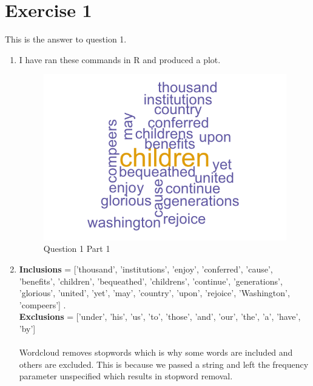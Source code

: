 \documentclass{article}
\date{}
\begin{document}
	
\section{Exercise 1}
This is the answer to question 1.
\begin{enumerate}
	
	\item I have ran these commands in R and produced a plot.
	\begin{figure}[!h]
		\centering
		\includegraphics[width=0.3\linewidth]{q1e1.png}
		\caption{Question 1 Part 1}
	\end{figure}
	
	\item \textbf{Inclusions} = ['thousand',  'institutions', 'enjoy', 'conferred', 'cause', 'benefits', 'children', 'bequeathed', 'childrens', 'continue', 'generations', 'glorious', 'united', 'yet', 'may', 'country', 'upon', 'rejoice', 'Washington', 'compeers'] .
	\\
	\textbf{Exclusions} = ['under', 'his', 'us', 'to', 'those', 'and', 'our', 'the', 'a', 'have', 'by']\\
	\\
	Wordcloud removes stopwords which is why some words are included and others are excluded. This is because we passed a string and left the frequency parameter unspecified which results in stopword removal.
	

\end{enumerate}
\end{document}
